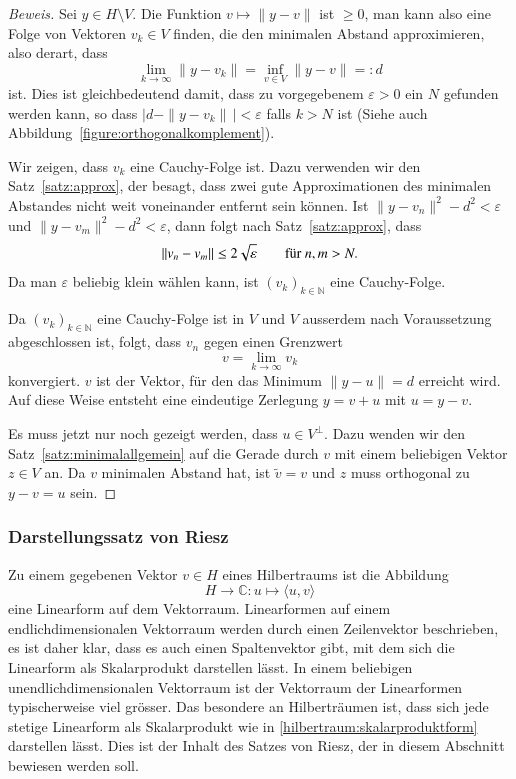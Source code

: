 \begin{proof}[Beweis]
Sei $y\in H\setminus V$.
Die Funktion $v\mapsto \|y-v\|$ ist $\ge 0$, man kann also eine
Folge von Vektoren $v_k\in V$ finden, die den minimalen Abstand
approximieren, also derart, dass
\[
\lim_{k\to\infty} \|y-v_k\| = \inf_{v\in V} \|y-v\| =: d
\]
ist.
Dies ist gleichbedeutend damit, dass zu vorgegebenem $\varepsilon>0$ ein
$N$ gefunden werden kann, so dass $|d- \|y-v_k\|\,| < \varepsilon$ falls
$k>N$ ist (Siehe auch Abbildung~\ref{figure:orthogonalkomplement}).

Wir zeigen, dass $v_k$ eine Cauchy-Folge ist.
Dazu verwenden wir den Satz~\ref{satz:approx}, der besagt, dass zwei
gute Approximationen des minimalen Abstandes nicht weit voneinander
entfernt sein können.
Ist
$\|y-v_n\|^2 - d^2  < \varepsilon$ 
und
$\|y-v_m\|^2 - d^2  < \varepsilon$,
dann folgt nach Satz~\ref{satz:approx}, dass
\[
\|v_n-v_m\|
\le 2\sqrt{\mathstrut\varepsilon}
\qquad
\text{für $n,m>N.$}
\]
Da man $\varepsilon$ beliebig klein wählen kann, ist $(v_k)_{k\in\mathbb N}$
eine Cauchy-Folge.

Da $(v_k)_{k\in\mathbb N}$ eine Cauchy-Folge ist in $V$ und $V$ ausserdem
nach Voraussetzung abgeschlossen ist, folgt, dass $v_n$ gegen einen Grenzwert 
\[
v=\lim_{k\to\infty} v_k
\]
konvergiert.
$v$ ist der Vektor, für den das Minimum $\|y-u\|=d$ erreicht wird.
Auf diese Weise entsteht eine eindeutige Zerlegung $y = v + u$ mit $u=y-v$.

Es muss jetzt nur noch gezeigt werden, dass $u\in V^{\perp}$.
Dazu wenden wir den Satz~\ref{satz:minimalallgemein} auf die Gerade
durch $v$ mit einem beliebigen Vektor $z\in V$ an.
Da $v$ minimalen Abstand hat, ist $\tilde{v}=v$ und $z$ muss orthogonal
zu $y-v=u$ sein.
\end{proof}

\subsubsection{Darstellungssatz von Riesz
\label{subsubsection:riesz}}
%
%
%
%
Zu einem gegebenen Vektor $v\in H$ eines Hilbertraums ist die Abbildung
\begin{equation}
H\to\mathbb C
:
u\mapsto \langle u,v\rangle
\label{hilbertraum:skalarproduktform}
\end{equation}
eine Linearform auf dem Vektorraum.
Linearformen auf einem endlichdimensionalen Vektorraum werden durch
einen Zeilenvektor beschrieben, es ist daher klar, dass es auch einen
Spaltenvektor gibt, mit dem sich die Linearform als Skalarprodukt
darstellen lässt.
In einem beliebigen unendlichdimensionalen Vektorraum ist der Vektorraum
der Linearformen typischerweise viel grösser.
Das besondere an Hilberträumen ist, dass sich jede stetige Linearform
als Skalarprodukt wie in \eqref{hilbertraum:skalarproduktform}
darstellen lässt.
Dies ist der Inhalt des Satzes von Riesz, der in diesem Abschnitt
bewiesen werden soll.

